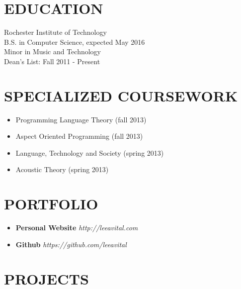 \documentclass[line,margin]{res}
\begin{document}
\address{80 Colony Manor Drive, Apartment 5\\ Rochester, NY 14623}
\address{(646) 320-9143\\leeavital@gmail.com}


\begin{resume}
 
\section{EDUCATION}  Rochester Institute of Technology \\ 
                     B.S. in  Computer Science,  expected May 2016 \\
	                 Minor in Music and Technology\\
	                 Dean's List: Fall 2011 - Present


\section{SPECIALIZED COURSEWORK}
\begin{itemize} \itemsep -2pt
   \item Programming Language Theory (fall 2013)
   \item Aspect Oriented Programming (fall 2013)
   \item Language, Technology and Society (spring 2013)
   \item Acoustic Theory (spring 2013)
\end{itemize}


\section{PORTFOLIO}

\begin{itemize} \itemsep -2pt
   \item {\bf Personal Website}  {\sl http://leeavital.com}
   \item {\bf Github}	{\sl  https://github.com/leeavital }
\end{itemize}



\section{PROJECTS}

\begin{itemize} \itemsep -2pt


\end{itemize}
\end{resume}
\end{document}
